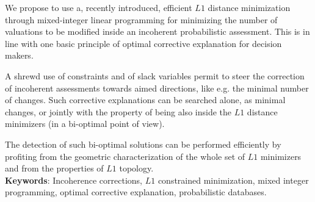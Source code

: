
We propose to use a, recently introduced,  efficient $L1$ distance minimization through mixed-integer
linear programming for minimizing the number of valuations to be modified inside an incoherent probabilistic assessment. This is in line with one basic principle of optimal corrective explanation for decision makers.

 A shrewd use of constraints and of slack variables permit to steer the correction of incoherent assessments towards aimed directions, like e.g. the minimal number of changes. Such corrective explanations can be searched alone, as minimal changes, or jointly with the property of being also inside the $L1$ distance minimizers (in a bi-optimal point of view).
 
 The detection of such bi-optimal solutions can be performed efficiently by profiting from the geometric characterization of the whole set of $L1$ minimizers and from the properties of $L1$ topology.
 \\
\textbf{Keywords}: Incoherence corrections, $L1$ constrained minimization, mixed integer programming, optimal corrective explanation, probabilistic databases.

